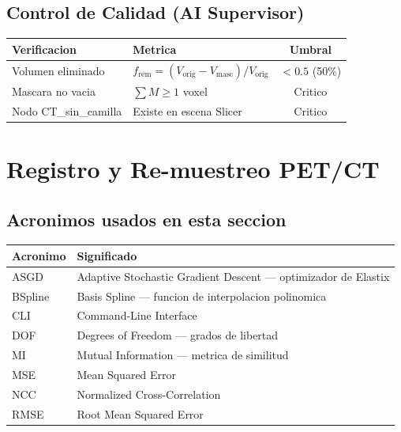 \documentclass[12pt,a4paper]{article}
\begin{document}
\subsection{Control de Calidad (AI Supervisor)}

\begin{table}[H]
\centering
\begin{tabular}{llc}
\toprule
\textbf{Verificacion} & \textbf{Metrica} & \textbf{Umbral} \\
\midrule
Volumen eliminado & $f_{\text{rem}} = (V_{\text{orig}} - V_{\text{masc}})/V_{\text{orig}}$ & $< 0.5$ (50\%) \\
Mascara no vacia & $\sum M \geq 1$ voxel & Critico \\
Nodo CT\_sin\_camilla & Existe en escena Slicer & Critico \\
\bottomrule
\end{tabular}
\end{table}

\newpage

\section{Registro y Re-muestreo PET/CT}
\label{sec:registro}

\subsection*{Acronimos usados en esta seccion}
\begin{tabular}{ll}
\toprule
\textbf{Acronimo} & \textbf{Significado} \\
\midrule
ASGD & Adaptive Stochastic Gradient Descent --- optimizador de Elastix \\
BSpline & Basis Spline --- funcion de interpolacion polinomica \\
CLI & Command-Line Interface \\
DOF & Degrees of Freedom --- grados de libertad \\
MI & Mutual Information --- metrica de similitud \\
MSE & Mean Squared Error \\
NCC & Normalized Cross-Correlation \\
RMSE & Root Mean Squared Error \\
\bottomrule
\end{tabular}
\end{document}
